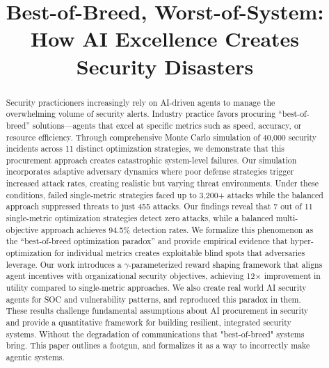\documentclass[10pt,conference]{IEEEtran}
\begin{document}
\title{Best-of-Breed, Worst-of-System: How AI Excellence Creates Security Disasters}

\author{
\and
{}
\and
{}
\and
{}
}



\maketitle

\begin{abstract}
Security practicioners increasingly rely on AI-driven agents to manage the overwhelming volume of security alerts. Industry practice favors procuring ``best-of-breed'' solutions---agents that excel at specific metrics such as speed, accuracy, or resource efficiency. Through comprehensive Monte Carlo simulation of 40,000 security incidents across 11 distinct optimization strategies, we demonstrate that this procurement approach creates catastrophic system-level failures. Our simulation incorporates adaptive adversary dynamics where poor defense strategies trigger increased attack rates, creating realistic but varying threat environments. Under these conditions, failed single-metric strategies faced up to 3,200+ attacks while the balanced approach suppressed threats to just 455 attacks. Our findings reveal that 7 out of 11 single-metric optimization strategies detect zero attacks, while a balanced multi-objective approach achieves 94.5\% detection rates. We formalize this phenomenon as the ``best-of-breed optimization paradox'' and provide empirical evidence that hyper-optimization for individual metrics creates exploitable blind spots that adversaries leverage. Our work introduces a $\gamma$-parameterized reward shaping framework that aligns agent incentives with organizational security objectives, achieving 12$\times$ improvement in utility compared to single-metric approaches. We also create real world AI security agents for SOC and vulnerability patterns, and reproduced this paradox in them. 
These results challenge fundamental assumptions about AI procurement in security and provide a quantitative framework for building resilient, integrated security systems. Without the degradation of communications that "best-of-breed" systems bring.
This paper outlines a footgun, and formalizes it as a way to incorrectly make agentic systems.
\end{abstract}
\end{document}
